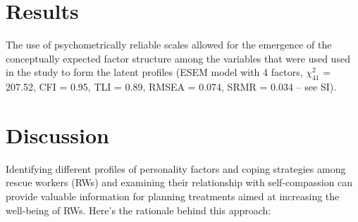 \documentclass[
  man]{apa7}
\begin{document}
\hypertarget{results}{%
\section{Results}\label{results}}

The use of psychometrically reliable scales allowed for the emergence of the conceptually expected factor structure among the variables that were used used in the study to form the latent profiles (ESEM model with 4 factors, \(\chi^2_{41}\) = 207.52, CFI = 0.95, TLI = 0.89, RMSEA = 0.074, SRMR = 0.034 -- see SI).

\hypertarget{discussion}{%
\section{Discussion}\label{discussion}}

Identifying different profiles of personality factors and coping strategies among rescue workers (RWs) and examining their relationship with self-compassion can provide valuable information for planning treatments aimed at increasing the well-being of RWs. Here's the rationale behind this approach:
\end{document}
